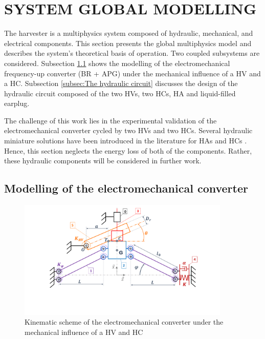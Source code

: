 \documentclass[3p,twocolumn,preprint]{elsarticle}
\begin{document}
\section{SYSTEM GLOBAL MODELLING}
\label{sec:SYSTEM MODELING}
The harvester is a multiphysics system composed of hydraulic, mechanical, and electrical components. This section presents the global multiphysics model and describes the system's theoretical basis of operation. Two coupled subsystems are considered. Subsection \ref{subsec:The electromechanical converter} shows the modelling of the electromechanical frequency-up converter (BR + APG) under the mechanical influence of a HV and a HC. Subsection \ref{subsec:The hydraulic circuit} discusses the design of the hydraulic circuit composed of the two HVs, two HCs, HA and liquid-filled earplug.

The challenge of this work lies in the experimental validation of the electromechanical converter cycled by two HVs and two HCs. Several hydraulic miniature solutions have been introduced in the literature for HAs and HCs \cite{Wang2020,Xu2021,Zhu2013}. Hence, this section neglects the energy loss of both of the components. Rather, these hydraulic components will be considered in further work. 
	\subsection{Modelling of the electromechanical converter}	
	\label{subsec:The electromechanical converter}
\begin{figure}[!htbp]
	\centering
	\captionsetup{justification=centering}
	\includegraphics[trim={0cm 0cm 0cm 0cm},clip, width=0.9\textwidth]{figures/schema_cinematique1.pdf}
	\caption{Kinematic scheme of the electromechanical converter under the mechanical influence of a HV and HC}
	\label{fig:schema_cinematique1}
\end{figure}
\end{document}
